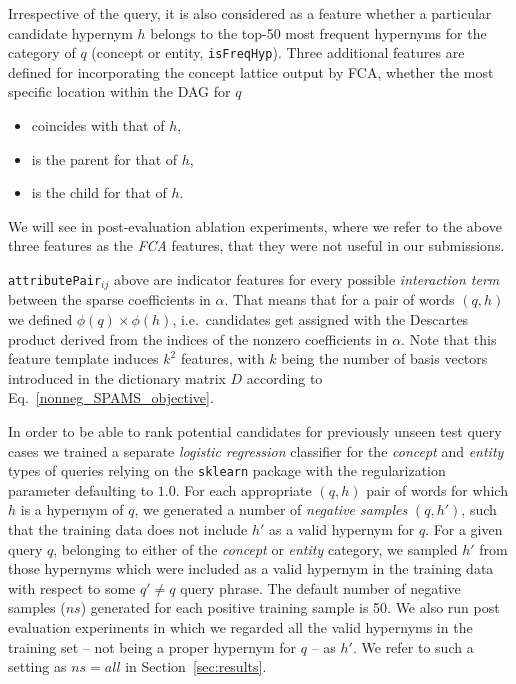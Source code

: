 \documentclass[11pt,a4paper]{article}
\begin{document}
Irrespective of the query, it is also considered as a feature whether a
particular candidate hypernym $h$ belongs to the top-50 most frequent hypernyms
for the category of $q$ (concept or entity, \texttt{isFreqHyp}).
Three additional features are defined for incorporating the concept lattice
output by FCA, whether the most specific location within the DAG for $q$
\begin{itemize}
	\item coincides with that of $h$,
	\item is the parent for that of $h$,
	\item is the child for that of $h$.
\end{itemize}
We will see in post-evaluation ablation experiments, where we refer to the
above three features as the \emph{FCA} features, that they were not useful in
our submissions.



\texttt{attributePair}$_{ij}$ above are indicator features for every possible
\emph{interaction term}
between the sparse coefficients in $\alpha$. That means that for a pair of
words $(q, h)$ we defined $\phi(q) \times \phi(h)$, i.e.~candidates
get assigned with the Descartes product derived from the indices of the nonzero
coefficients in $\alpha$. Note that this feature template induces $k^2$
features, with $k$ being the number of basis vectors introduced in the dictionary matrix $D$ according to Eq.~\ref{nonneg_SPAMS_objective}.

In order to be able to rank potential candidates for previously unseen test
query cases we trained a separate \emph{logistic regression} classifier for the
\textit{concept} and \textit{entity} types of queries relying on the
\texttt{sklearn} package with the regularization parameter defaulting to $1.0$.
For each appropriate $(q,h)$ pair of words for which
$h$ is a hypernym of $q$, we generated a number of \emph{negative samples} $(q, h')$,
such that the training data does not include $h'$ as a valid hypernym for $q$.
For a given query $q$, belonging to either of the \textit{concept} or
\textit{entity} category, we sampled $h'$ from those hypernyms which were
included as a valid hypernym in the training data with respect to some $q' \neq
q$ query phrase. The default number of negative samples ($ns$) generated for
each
positive training sample is 50. We also run post evaluation experiments in
which we regarded all the valid hypernyms in the training set -- not being a
proper hypernym for $q$ -- as $h'$. We refer to such a setting as $ns=all$ in
Section~\ref{sec:results}.
\end{document}

